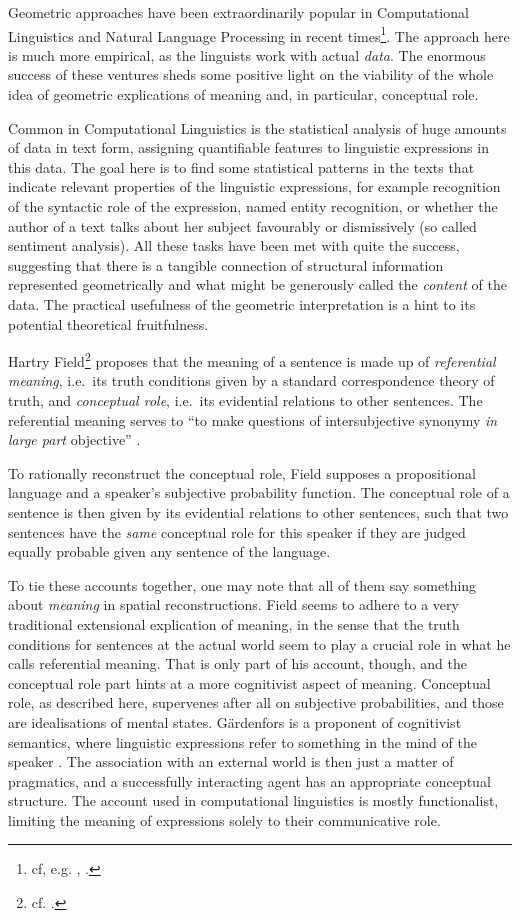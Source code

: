 \documentclass[11pt, a4paper]{scrartcl}
\renewcommand{\i}[1]{\emph{#1}}
\begin{document}
Geometric approaches have been extraordinarily popular in Computational Linguistics and Natural Language Processing in recent times\footnote{cf, e.g. \textcite{erk2008structured}, \textcite{sahlgren2006word}.}. The approach here is much more empirical, as the linguists work with actual \i{data}. The enormous success of these ventures sheds some positive light on the viability of the whole idea of geometric explications of meaning and, in particular, conceptual role.

Common in Computational Linguistics is the statistical analysis of huge amounts of data in text form, assigning quantifiable features to linguistic expressions in this data. The goal here is to find some statistical patterns in the texts that indicate relevant properties of the linguistic expressions, for example recognition of the syntactic role of the expression, named entity recognition, or whether the author of a text talks about her subject favourably or dismissively (so called sentiment analysis). All these tasks have been met with quite the success, suggesting that there is a tangible connection of structural information represented geometrically and what might be generously called the \i{content} of the data. The practical usefulness of the geometric interpretation is a hint to its potential theoretical fruitfulness. 

Hartry Field\footnote{cf. \textcite{Field1977}.} proposes that the meaning of a sentence is made up of \i{referential meaning}, i.e.\ its truth conditions given by a standard correspondence theory of truth, and \i{conceptual role}, i.e.\ its evidential relations to other sentences. The referential meaning serves to ``to make questions of intersubjective synonymy \i{in large part} objective'' \parencite[399]{Field1977}.

To rationally reconstruct the conceptual role, Field supposes a propositional language and a speaker's subjective probability function. The conceptual role of a sentence is then given by its evidential relations to other sentences, such that two sentences have the \i{same} conceptual role for this speaker if they are judged equally probable given any sentence of the language. 

To tie these accounts together, one may note that all of them say something about \i{meaning} in spatial reconstructions. Field seems to adhere to a very traditional extensional explication of meaning, in the sense that the truth conditions for sentences at the actual world seem to play a crucial role in what he calls referential meaning. That is only part of his account, though, and the conceptual role part hints at a more cognitivist aspect of meaning. Conceptual role, as described here, supervenes after all on subjective probabilities, and those are idealisations of mental states. Gärdenfors is a proponent of cognitivist semantics, where linguistic expressions refer to something in the mind of the speaker \parencite[154]{gärdenfors2004conceptual}. The association with an external world is then just a matter of pragmatics, and a successfully interacting agent has an appropriate conceptual structure. The account used in computational linguistics is mostly functionalist, limiting the meaning of expressions solely to their communicative role. 
\end{document}
